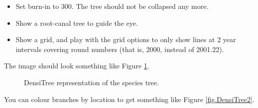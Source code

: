\documentclass{article}
\begin{document}
\begin{itemize}
\item Set burn-in to 300. The tree should not be collapsed any more.
\item Show a root-canal tree to guide the eye. 
\item Show a grid, and play with the grid options to only show lines at 2 year intervals covering round numbers (that is, 2000, instead of 2001.22).
\end{itemize}

The image should look something like Figure \ref{fig.DensiTree}.

\begin{figure}
\begin{center}
\end{center}
\caption{\label{fig.DensiTree} DensiTree representation of the species tree.}
\end{figure}

You can colour branches by location to get something like Figure \ref{fig.DensiTree2}.
\end{document}
